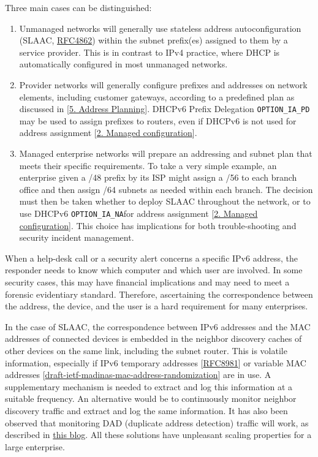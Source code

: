 \documentclass[
]{article}
\begin{document}
Three main cases can be distinguished:

\begin{enumerate}
\def\labelenumi{\arabic{enumi}.}
\item
  Unmanaged networks will generally use stateless address
  autoconfiguration (SLAAC,
  \href{https://www.rfc-editor.org/info/rfc4862}{RFC4862}) within the
  subnet prefix(es) assigned to them by a service provider. This is in
  contrast to IPv4 practice, where DHCP is automatically configured in
  most unmanaged networks.
\item
  Provider networks will generally configure prefixes and addresses on
  network elements, including customer gateways, according to a
  predefined plan as discussed in {[}\hyperref[address-planning]{5.
  Address Planning}{]}. DHCPv6 Prefix Delegation \texttt{OPTION\_IA\_PD}
  may be used to assign prefixes to routers, even if DHCPv6 is not used
  for address assignment {[}\hyperref[managed-configuration]{2. Managed
  configuration}{]}.
\item
  Managed enterprise networks will prepare an addressing and subnet plan
  that meets their specific requirements. To take a very simple example,
  an enterprise given a /48 prefix by its ISP might assign a /56 to each
  branch office and then assign /64 subnets as needed within each
  branch. The decision must then be taken whether to deploy SLAAC
  throughout the network, or to use DHCPv6 \texttt{OPTION\_IA\_NA}for
  address assignment {[}\hyperref[managed-configuration]{2. Managed
  configuration}{]}. This choice has implications for both
  trouble-shooting and security incident management.
\end{enumerate}

When a help-desk call or a security alert concerns a specific IPv6
address, the responder needs to know which computer and which user are
involved. In some security cases, this may have financial implications
and may need to meet a forensic evidentiary standard. Therefore,
ascertaining the correspondence between the address, the device, and the
user is a hard requirement for many enterprises.

In the case of SLAAC, the correspondence between IPv6 addresses and the
MAC addresses of connected devices is embedded in the neighbor discovery
caches of other devices on the same link, including the subnet router.
This is volatile information, especially if IPv6 temporary addresses
{[}\href{https://www.rfc-editor.org/info/rfc8981}{RFC8981}{]} or
variable MAC addresses
{[}\href{https://datatracker.ietf.org/doc/draft-ietf-madinas-mac-address-randomization/}{draft-ietf-madinas-mac-address-randomization}{]}
are in use. A supplementary mechanism is needed to extract and log this
information at a suitable frequency. An alternative would be to
continuously monitor neighbor discovery traffic and extract and log the
same information. It has also been observed that monitoring DAD
(duplicate address detection) traffic will work, as described in
\href{https://weberblog.net/monitoring-mac-ipv6-address-bindings/}{this
blog}. All these solutions have unpleasant scaling properties for a
large enterprise.
\end{document}
